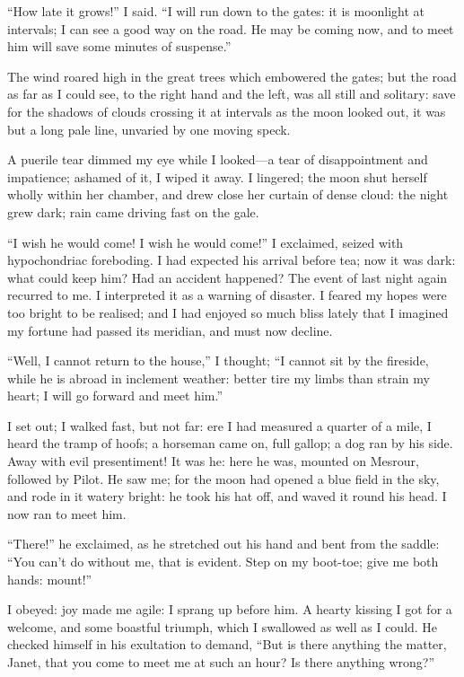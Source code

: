 \enquote{How late it grows!} I said.  \enquote{I will run down to the
	gates: it is moonlight at intervals; I can see a good way on the road.
	He may be coming now, and to meet him will save some minutes of
	suspense.}

The wind roared high in the great trees which embowered the gates; but
the road as far as I could see, to the right hand and the left, was all
still and solitary: save for the shadows of clouds crossing it at
intervals as the moon looked out, it was but a long pale line, unvaried
by one moving speck.

A puerile tear dimmed my eye while I looked---a tear of disappointment
and impatience; ashamed of it, I wiped it away.  I lingered; the moon
shut herself wholly within her chamber, and drew close her curtain of
dense cloud: the night grew dark; rain came driving fast on the gale.

\enquote{I wish he would come!  I wish he would come!} I exclaimed,
seized with hypochondriac foreboding.  I had expected his arrival before
tea; now it was dark: what could keep him?  Had an accident happened?
The event of last night again recurred to me.  I interpreted it as a
warning of disaster.  I feared my hopes were too bright to be realised;
and I had enjoyed so much bliss lately that I imagined my fortune had
passed its meridian, and must now decline.

\enquote{Well, I cannot return to the house,} I thought; \enquote{I
	cannot sit by the fireside, while he is abroad in inclement weather:
	better tire my limbs than strain my heart; I will go forward and meet
	him.}

I set out; I walked fast, but not far: ere I had measured a quarter of a
mile, I heard the tramp of hoofs; a horseman came on, full gallop; a dog
ran by his side.  Away with evil presentiment!  It was he: here he was,
mounted on Mesrour, followed by Pilot.  He saw me; for the moon had
opened a blue field in the sky, and rode in it watery bright: he took
his hat off, and waved it round his head.  I now ran to meet him.

\enquote{There!} he exclaimed, as he stretched out his hand and bent
from the saddle: \enquote{You can't do without me, that is evident.
	Step on my boot-toe; give me both hands: mount!}

I obeyed: joy made me agile: I sprang up before him.  A hearty kissing I
got for a welcome, and some boastful triumph, which I swallowed as well
as I could.  He checked himself in his exultation to demand,
\enquote{But is there anything the matter, Janet, that you come to meet
	me at such an hour?  Is there anything wrong?}

